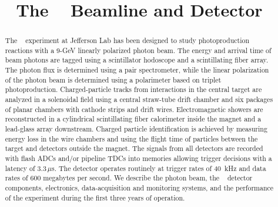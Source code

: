 \documentclass{elsarticle}
\begin{document}
  


\linenumbers   
 
\begin{frontmatter} 


\title{The \gx~ Beamline and Detector}





\begin{abstract}
The \gx~ experiment at Jefferson Lab has been designed to study photoproduction reactions with a 9-GeV linearly polarized photon beam. The energy and arrival time of beam photons are tagged using a scintillator
hodoscope and a scintillating fiber array. The photon flux is determined using a pair spectrometer, while the linear polarization of the photon beam is determined using a polarimeter based on triplet photoproduction.
Charged-particle tracks from interactions in the central target are analyzed in a solenoidal field using a central straw-tube
drift chamber and six packages of planar chambers with cathode strips and drift wires. Electromagnetic showers are reconstructed in a cylindrical scintillating fiber calorimeter inside the magnet and
a lead-glass array downstream. Charged particle identification is achieved by measuring energy loss in the wire chambers and using the flight time of particles between the target and detectors outside the magnet. The signals from all detectors are recorded with flash ADCs and/or pipeline TDCs into memories allowing trigger decisions with a latency of 3.3\,$\mu$s. The detector operates routinely at
trigger rates of 40~kHz and data rates of 600 megabytes per second. We describe the photon beam, the \gx~ detector components, electronics, data-acquisition and monitoring systems, and the performance of the experiment during the first three 
years of operation.
\end{abstract}   


\end{frontmatter}
  
  
   
\end{document}
